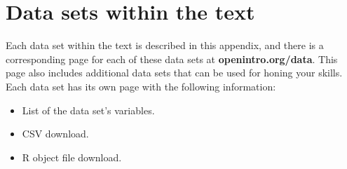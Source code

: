 \chapter{Data sets within the text}
\label{appendix_data}
\label{data_appendix}



Each data set within the text is described in this appendix,
and there is a corresponding page for each of these data sets at
    {\color{black}\textbf{openintro.org/data}}.
This page also includes additional data sets that can be
used for honing your skills.
Each data set has its own page with the following information:
\begin{itemize}
\item
    List of the data set's variables.
\item
    CSV download.
\item
    R object file download.
\end{itemize}


\newcommand{\datawrap}[1]{#1 $\to$}


\section{}
\label{ch_intro_to_data_data}

